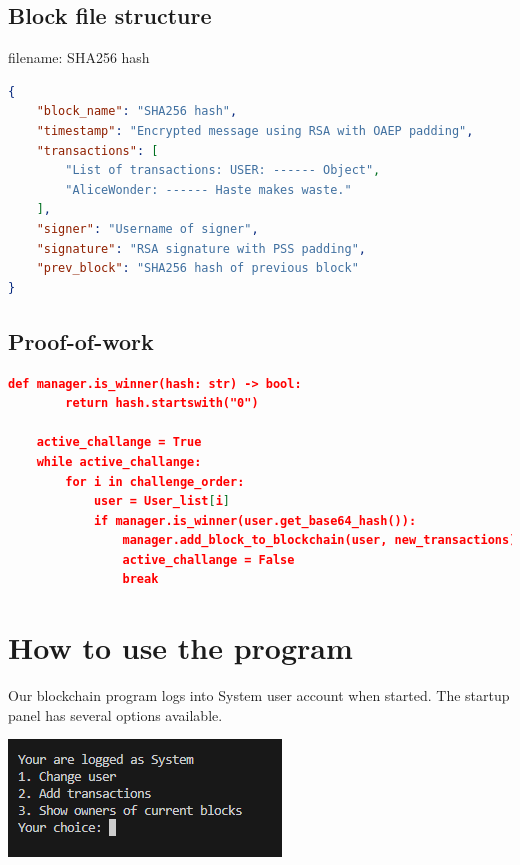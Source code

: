 \documentclass{article}
\begin{document}
\subsection{Block file structure}
filename: SHA256 hash
\begin{lstlisting}[language=json]
{
    "block_name": "SHA256 hash",
    "timestamp": "Encrypted message using RSA with OAEP padding",
    "transactions": [
        "List of transactions: USER: ------ Object",
        "AliceWonder: ------ Haste makes waste."
    ],
    "signer": "Username of signer",
    "signature": "RSA signature with PSS padding",
    "prev_block": "SHA256 hash of previous block"
}
\end{lstlisting}

\subsection{Proof-of-work}
\begin{lstlisting}[language=json]
    def manager.is_winner(hash: str) -> bool:
        return hash.startswith("0")

    active_challange = True
    while active_challange:
        for i in challenge_order:
            user = User_list[i]
            if manager.is_winner(user.get_base64_hash()):
                manager.add_block_to_blockchain(user, new_transactions)
                active_challange = False
                break
\end{lstlisting}

\section{How to use the program}

Our blockchain program logs into System user account when started. The startup panel has several options available. 

\vspace{0.5cm}
\includegraphics{start.png}
\end{document}

